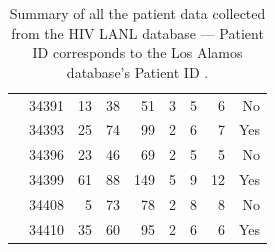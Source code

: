 \documentclass[12pt]{article}
\begin{document}
\begin{table}[!ht]
\begin{center}
\begin{tabular}{llrrrrrrr}
\cite{Novitsky09}%
& 34391 &     13 &       38 &       51 &        3 &        5 &        6 &   No \\ 
& 34393 &     25 &       74 &       99 &        2 &        6 &        7 &   Yes  \\ 
& 34396 &      23 &       46 &       69 &        2 &        5 &        5 &   No \\ 
& 34399 &      61 &       88 &      149 &        5 &        9 &       12 &   Yes \\ 
& 34408 &       5 &       73 &       78 &        2 &        8 &        8 &    No \\ 
& 34410 &      35 &       60 &       95 &        2 &        6 &        6 &    Yes \\ 
\end{tabular}
\end{center}
  \caption{Summary of all the patient data collected from the HIV LANL database --- Patient ID corresponds to the Los Alamos database's Patient ID \citep{LosAlamos}.
   }\label{tab:patients} 
\end{table}
\end{document}
